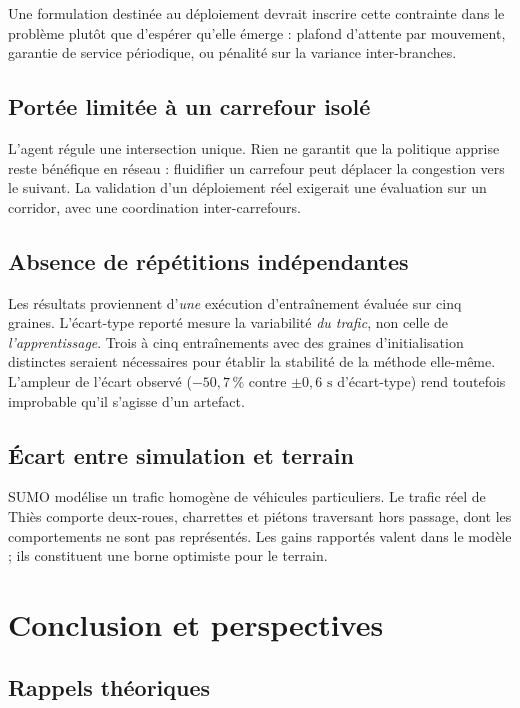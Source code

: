 \documentclass[11pt,a4paper]{article}
\begin{document}
Une formulation destinée au déploiement devrait inscrire cette contrainte dans le
problème plutôt que d'espérer qu'elle émerge : plafond d'attente par mouvement,
garantie de service périodique, ou pénalité sur la variance inter-branches.

\subsection{Portée limitée à un carrefour isolé}

L'agent régule une intersection unique. Rien ne garantit que la politique apprise
reste bénéfique en réseau : fluidifier un carrefour peut déplacer la congestion vers
le suivant. La validation d'un déploiement réel exigerait une évaluation sur un
corridor, avec une coordination inter-carrefours.

\subsection{Absence de répétitions indépendantes}

Les résultats proviennent d'\emph{une} exécution d'entraînement évaluée sur cinq
graines. L'écart-type reporté mesure la variabilité \emph{du trafic}, non celle de
\emph{l'apprentissage}. Trois à cinq entraînements avec des graines d'initialisation
distinctes seraient nécessaires pour établir la stabilité de la méthode elle-même.
L'ampleur de l'écart observé ($-50{,}7\,\%$ contre $\pm 0{,}6\text{ s}$ d'écart-type)
rend toutefois improbable qu'il s'agisse d'un artefact.

\subsection{Écart entre simulation et terrain}

SUMO modélise un trafic homogène de véhicules particuliers. Le trafic réel de Thiès
comporte deux-roues, charrettes et piétons traversant hors passage, dont les
comportements ne sont pas représentés. Les gains rapportés valent dans le modèle ; ils
constituent une borne optimiste pour le terrain.

\section{Conclusion et perspectives}

\subsection{Rappels théoriques}
\end{document}
